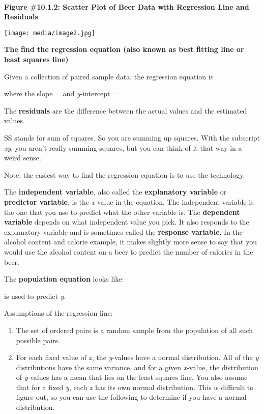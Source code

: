 \documentclass[]{book}
\begin{document}
\textbf{\\
}

\textbf{Figure \#10.1.2: Scatter Plot of Beer Data with Regression Line and
Residuals}

\texttt{[image: media/image2.jpg]}

\textbf{The find the regression equation (also known as best fitting line or
least squares line)}

Given a collection of paired sample data, the regression equation is

where the slope = and \emph{y}-intercept =

The \textbf{residuals} are the difference between the actual values and the
estimated values.

SS stands for sum of squares. So you are summing up squares. With the
subscript \emph{xy}, you aren't really summing squares, but you can think of
it that way in a weird sense.

Note: the easiest way to find the regression equation is to use the technology.

The \textbf{independent variable}, also called the \textbf{explanatory variable} or \textbf{predictor variable}, is the \emph{x}-value in the equation. The independent variable is the one that you use to predict what the other variable is. The \textbf{dependent variable} depends on what independent value you pick. It also responds to the explanatory variable and is sometimes called the \textbf{response variable}. In the alcohol content and calorie example, it makes slightly more sense to say that you would use the alcohol content on a beer to predict the number of calories in the beer.

The \textbf{population equation} looks like:

is used to predict \emph{y}.

Assumptions of the regression line:

\begin{enumerate}
\def\labelenumi{\alph{enumi}.}
\item
  The set of ordered pairs is a random sample from the population of all such possible pairs.
\item
  For each fixed value of \emph{x}, the \emph{y}-values have a normal distribution. All of the \emph{y} distributions have the same variance, and for a given \emph{x}-value, the distribution of \emph{y}-values has a mean that lies on the least squares line. You also assume that for a fixed \emph{y}, each \emph{x} has its own normal distribution. This is difficult to figure out, so you can use the following to determine if you have a normal distribution.
\end{enumerate}
\end{document}
